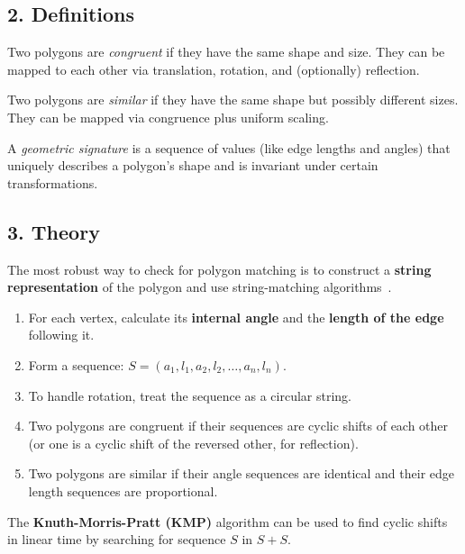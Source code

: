 \subsection{2. Definitions}
\begin{definition}
\label{def:pm_congruence}
Two polygons are \emph{congruent} if they have the same shape and size. They can be mapped to each other via translation, rotation, and (optionally) reflection.
\end{definition}

\begin{definition}
\label{def:pm_similarity}
Two polygons are \emph{similar} if they have the same shape but possibly different sizes. They can be mapped via congruence plus uniform scaling.
\end{definition}

\begin{definition}
\label{def:pm_signature}
A \emph{geometric signature} is a sequence of values (like edge lengths and angles) that uniquely describes a polygon's shape and is invariant under certain transformations.
\end{definition}

\subsection{3. Theory}
The most robust way to check for polygon matching is to construct a \textbf{string representation} of the polygon and use string-matching algorithms~\cite{arkin1991}.
\begin{enumerate}
    \item For each vertex, calculate its \textbf{internal angle} and the \textbf{length of the edge} following it.
    \item Form a sequence: $S = (a_1, l_1, a_2, l_2, \dots, a_n, l_n)$.
    \item To handle rotation, treat the sequence as a circular string.
    \item Two polygons are congruent if their sequences are cyclic shifts of each other (or one is a cyclic shift of the reversed other, for reflection).
    \item Two polygons are similar if their angle sequences are identical and their edge length sequences are proportional.
\end{enumerate}

The \textbf{Knuth-Morris-Pratt (KMP)} algorithm can be used to find cyclic shifts in linear time by searching for sequence $S$ in $S+S$.

